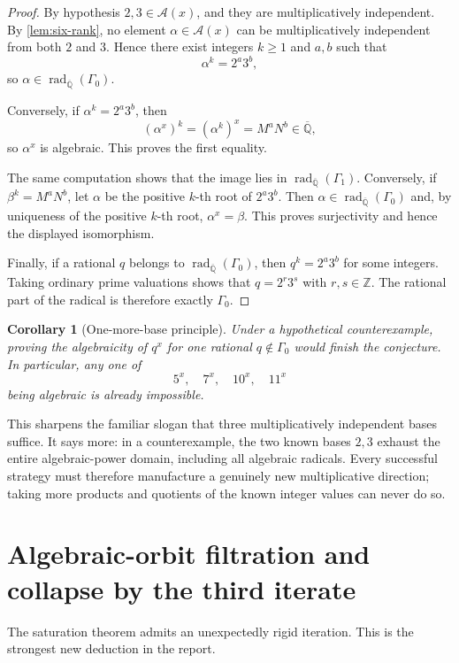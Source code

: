 \documentclass[11pt]{article}
\newtheorem{corollary}[theorem]{Corollary}
\theoremstyle{definition}
\newcommand{\Z}{\mathbb{Z}}
\newcommand{\Qbar}{\overline{\mathbb{Q}}}
\newcommand{\rad}{\operatorname{rad}}
\newcommand{\Gammao}{\Gamma_0}
\newcommand{\Gammai}{\Gamma_1}
\newcommand{\Alg}{\mathcal{A}}
\begin{document}
\begin{proof}
By hypothesis $2,3\in\Alg(x)$, and they are multiplicatively independent.
By \cref{lem:six-rank}, no element $\alpha\in\Alg(x)$ can be multiplicatively
independent from both $2$ and $3$.  Hence there exist integers $k\geq1$ and
$a,b$ such that
\[
          \alpha^k=2^a3^b,
\]
so $\alpha\in\rad_{\Qbar}(\Gammao)$.

Conversely, if $\alpha^k=2^a3^b$, then
\[
       (\alpha^x)^k=(\alpha^k)^x=M^aN^b\in\Qbar,
\]
so $\alpha^x$ is algebraic.  This proves the first equality.

The same computation shows that the image lies in
$\rad_{\Qbar}(\Gammai)$.  Conversely, if $\beta^k=M^aN^b$, let $\alpha$ be the
positive $k$-th root of $2^a3^b$.  Then $\alpha\in\rad_{\Qbar}(\Gammao)$ and,
by uniqueness of the positive $k$-th root, $\alpha^x=\beta$.  This proves
surjectivity and hence the displayed isomorphism.

Finally, if a rational $q$ belongs to $\rad_{\Qbar}(\Gammao)$, then
$q^k=2^a3^b$ for some integers.  Taking ordinary prime valuations shows that
$q=2^r3^s$ with $r,s\in\Z$.  The rational part of the radical is therefore
exactly $\Gammao$.
\end{proof}

\begin{corollary}[One-more-base principle]
\label{cor:one-more-base}
Under a hypothetical counterexample, proving the algebraicity of $q^x$ for
\emph{one} rational $q\notin\Gammao$ would finish the conjecture.  In
particular, any one of
\[
          5^x,\quad 7^x,\quad 10^x,\quad 11^x
\]
being algebraic is already impossible.
\end{corollary}

This sharpens the familiar slogan that three multiplicatively independent
bases suffice.  It says more: in a counterexample, the two known bases
$2,3$ exhaust the entire algebraic-power domain, including all algebraic
radicals.  Every successful strategy must therefore manufacture a genuinely
new multiplicative direction; taking more products and quotients of the known
integer values can never do so.

\section{Algebraic-orbit filtration and collapse by the third iterate}

The saturation theorem admits an unexpectedly rigid iteration.  This is the
strongest new deduction in the report.
\end{document}
